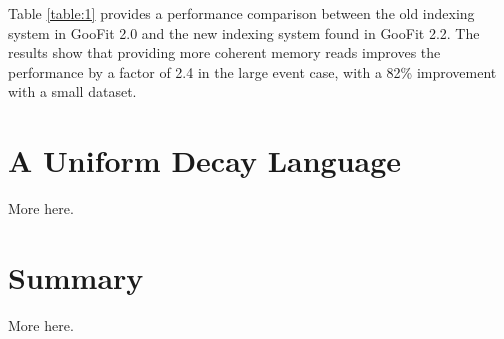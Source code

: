 \documentclass{webofc}
\begin{document}
Table \ref{table:1} provides a performance comparison between the old indexing system in GooFit 2.0 and the new indexing system found in GooFit 2.2. The results show that providing more coherent memory reads improves the performance by a factor of 2.4 in the large event case, with a 82\% improvement with a small dataset.

\section{A Uniform Decay Language}
\label{sec-ampgen}
More here.


\section{Summary}
\label{sec-summary}
More here.


%
\end{document}
